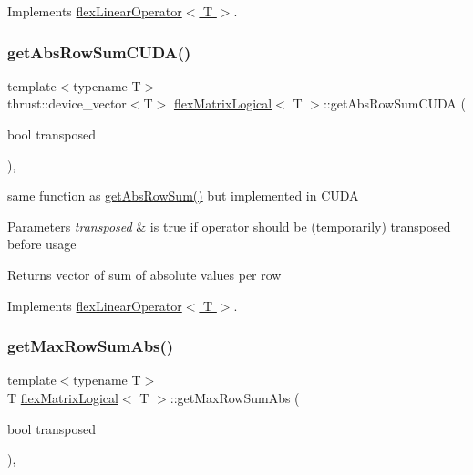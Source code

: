 Implements \hyperlink{classflex_linear_operator_ad6caa7b09e6e3c401cadef61b8e2307e}{flex\+Linear\+Operator$<$ T $>$}.

\mbox{\label{classflex_matrix_logical_a0245c73fb7d1fb3b1900208e0deb48d6}} 
\subsubsection{\texorpdfstring{get\+Abs\+Row\+Sum\+C\+U\+D\+A()}{getAbsRowSumCUDA()}}
{\footnotesize\ttfamily template$<$typename T$>$ \\
thrust\+::device\+\_\+vector$<$T$>$ \hyperlink{classflex_matrix_logical}{flex\+Matrix\+Logical}$<$ T $>$\+::get\+Abs\+Row\+Sum\+C\+U\+DA (\begin{DoxyParamCaption}\item[{bool}]{transposed }\end{DoxyParamCaption})\hspace{0.3cm}{\ttfamily [inline]}, {\ttfamily [virtual]}}



same function as \hyperlink{classflex_matrix_logical_a0c7cf2e5dde3a2d55ae95c6e54f94342}{get\+Abs\+Row\+Sum()} but implemented in C\+U\+DA 


\begin{DoxyParams}{Parameters}
{\em transposed} & is true if operator should be (temporarily) transposed before usage \\
\hline
\end{DoxyParams}
\begin{DoxyReturn}{Returns}
vector of sum of absolute values per row 
\end{DoxyReturn}


Implements \hyperlink{classflex_linear_operator_a0a0a431d43f4f9d36cbee0d31ba5a29b}{flex\+Linear\+Operator$<$ T $>$}.

\mbox{\label{classflex_matrix_logical_ab35a9ebf590236184573731bb08e176d}} 
\subsubsection{\texorpdfstring{get\+Max\+Row\+Sum\+Abs()}{getMaxRowSumAbs()}}
{\footnotesize\ttfamily template$<$typename T$>$ \\
T \hyperlink{classflex_matrix_logical}{flex\+Matrix\+Logical}$<$ T $>$\+::get\+Max\+Row\+Sum\+Abs (\begin{DoxyParamCaption}\item[{bool}]{transposed }\end{DoxyParamCaption})\hspace{0.3cm}{\ttfamily [inline]}, {\ttfamily [virtual]}}



